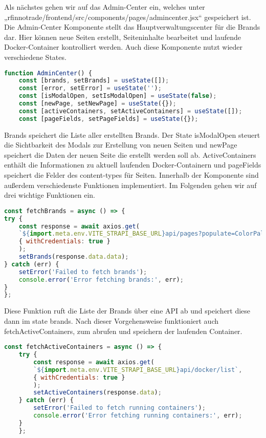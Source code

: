 Als nächstes gehen wir auf das Admin-Center ein, welches unter „rfinnotrade/frontend/src/components/pages/admincenter.jsx“ gespeichert ist. Die Admin-Center Komponente stellt das Hauptverwaltungscenter für die Brands dar. Hier können neue Seiten erstellt, Seiteninhalte bearbeitet und laufende Docker-Container kontrolliert werden.
Auch diese Komponente nutzt wieder verschiedene States.

\begin{lstlisting}[language=JavaScript, caption={AdminCenter.jsx states}, label={lst:admincenterjsxStates}]
function AdminCenter() {
    const [brands, setBrands] = useState([]);
    const [error, setError] = useState('');
    const [isModalOpen, setIsModalOpen] = useState(false);
    const [newPage, setNewPage] = useState({});
    const [activeContainers, setActiveContainers] = useState([]);
    const [pageFields, setPageFields] = useState({});
\end{lstlisting}

Brands speichert die Liste aller erstellten Brands. Der State isModalOpen steuert die Sichtbarkeit des Modals zur Erstellung von neuen Seiten und newPage speichert die Daten der neuen Seite die erstellt werden soll ab. ActiveContainers enthält die Informationen zu aktuell laufenden Docker-Containern und pageFields speichert die Felder des content-types für Seiten.
Innerhalb der Komponente sind außerdem verschiedenste Funktionen implementiert. Im Folgenden gehen wir auf drei wichtige Funktionen ein.

\begin{lstlisting}[language=JavaScript, caption={fetchBrands-Funktion}, label={lst:admincenterjsxFetchBrandsFunktion}]
const fetchBrands = async () => {
try {
    const response = await axios.get(
    `${import.meta.env.VITE_STRAPI_BASE_URL}api/pages?populate=ColorPalette`, 
    { withCredentials: true }
    );
    setBrands(response.data.data);
} catch (err) {
    setError('Failed to fetch brands');
    console.error('Error fetching brands:', err);
}
};
\end{lstlisting}

Diese Funktion ruft die Liste der Brands über eine API ab und speichert diese dann im state brands. Nach dieser Vorgehensweise funktioniert auch fetchActiveContainers, zum abrufen und speichern der laufenden Container.

\begin{lstlisting}[language=JavaScript, caption={fetchActiveContainers-Funktion}, label={lst:admincenterjsxFetchActiveContainersFunktion}]
const fetchActiveContainers = async () => {
    try {
        const response = await axios.get(
        `${import.meta.env.VITE_STRAPI_BASE_URL}api/docker/list`,
        { withCredentials: true }
        );
        setActiveContainers(response.data);
    } catch (err) {
        setError('Failed to fetch running containers');
        console.error('Error fetching running containers:', err);
    }
    };
\end{lstlisting}

